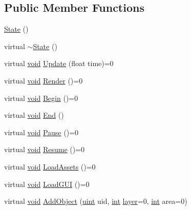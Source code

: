 \subsection*{Public Member Functions}
\begin{DoxyCompactItemize}
\item 
\hyperlink{class_state_ab91bb1dd5aa6260ab2a456581daf9ec2}{State} ()
\item 
virtual \hyperlink{class_state_a9ddc1df6f998184d6477b48fab90281c}{$\sim$\-State} ()
\item 
virtual \hyperlink{_s_d_l__opengles2__gl2ext_8h_ae5d8fa23ad07c48bb609509eae494c95}{void} \hyperlink{class_state_a6445efe57dd006dec3d5041272d4688c}{Update} (float time)=0
\item 
virtual \hyperlink{_s_d_l__opengles2__gl2ext_8h_ae5d8fa23ad07c48bb609509eae494c95}{void} \hyperlink{class_state_a34e26f04dda59f19396ae4b84c5379b6}{Render} ()=0
\item 
virtual \hyperlink{_s_d_l__opengles2__gl2ext_8h_ae5d8fa23ad07c48bb609509eae494c95}{void} \hyperlink{class_state_a7a2ee658bbed3ce76534b0f361227918}{Begin} ()=0
\item 
virtual \hyperlink{_s_d_l__opengles2__gl2ext_8h_ae5d8fa23ad07c48bb609509eae494c95}{void} \hyperlink{class_state_a1257ea9c7d84b2e31b27909d7cf69cf6}{End} ()
\item 
virtual \hyperlink{_s_d_l__opengles2__gl2ext_8h_ae5d8fa23ad07c48bb609509eae494c95}{void} \hyperlink{class_state_a5fc730ec6c771f86c5a6100878dc306f}{Pause} ()=0
\item 
virtual \hyperlink{_s_d_l__opengles2__gl2ext_8h_ae5d8fa23ad07c48bb609509eae494c95}{void} \hyperlink{class_state_a546fd634ce33cb867c5e8dfadb5e3ade}{Resume} ()=0
\item 
virtual \hyperlink{_s_d_l__opengles2__gl2ext_8h_ae5d8fa23ad07c48bb609509eae494c95}{void} \hyperlink{class_state_a4c9b03c8e989f36b475d6d625c0df4d0}{Load\-Assets} ()=0
\item 
virtual \hyperlink{_s_d_l__opengles2__gl2ext_8h_ae5d8fa23ad07c48bb609509eae494c95}{void} \hyperlink{class_state_a7a3468e6f6a0eb911ae28363a5347be0}{Load\-G\-U\-I} ()=0
\item 
virtual \hyperlink{_s_d_l__opengles2__gl2ext_8h_ae5d8fa23ad07c48bb609509eae494c95}{void} \hyperlink{class_state_ab1917931460de33c206f4733996e43c8}{Add\-Object} (\hyperlink{common_8hpp_a69aa29b598b851b0640aa225a9e5d61d}{uint} uid, \hyperlink{_s_d_l__thread_8h_a6a64f9be4433e4de6e2f2f548cf3c08e}{int} \hyperlink{_s_d_l__opengl__glext_8h_ae7bc0cdc2d90da1b600d6cc916c2772e}{layer}=0, \hyperlink{_s_d_l__thread_8h_a6a64f9be4433e4de6e2f2f548cf3c08e}{int} area=0)

\end{DoxyCompactItemize}
